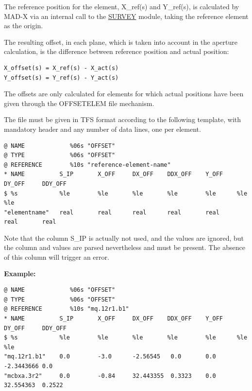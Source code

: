 The reference position for the element, X\_ref(s) and Y\_ref(s), is calculated 
by MAD-X via an internal call to the \href{../survey/survey.html}{SURVEY}
module, taking the reference element as the origin. 

The resulting offset, in each plane, which is taken into account in the aperture calculation, 
is the difference between reference position and actual position: 
\begin{verbatim}
X_offset(s) = X_ref(s) - X_act(s) 
Y_offset(s) = Y_ref(s) - Y_act(s)
\end{verbatim} 

The offsets are only calculated for elements for which actual positions 
have been given through the OFFSETELEM file mechanism. 

The file must be given in TFS format according to the following template, 
with mandatory header and any number of data lines, one per element. 

\begin{verbatim}
@ NAME             %06s "OFFSET" 
@ TYPE             %06s "OFFSET" 
@ REFERENCE        %10s "reference-element-name" 
* NAME          S_IP       X_OFF     DX_OFF    DDX_OFF    Y_OFF    DY_OFF     DDY_OFF
$ %s            %le        %le       %le       %le        %le      %le        %le
"elementname"	real       real      real      real       real     real       real
\end{verbatim}

Note that the column S\_IP is actually not used, and the values are ignored, 
but the column and values are parsed nevertheless and must be present. 
The absence of this column will trigger an error. 

{\bf Example:}
\begin{verbatim}
@ NAME             %06s "OFFSET" 
@ TYPE             %06s "OFFSET" 
@ REFERENCE        %10s "mq.12r1.b1" 
* NAME          S_IP       X_OFF     DX_OFF    DDX_OFF    Y_OFF    DY_OFF     DDY_OFF
$ %s            %le        %le       %le       %le        %le      %le        %le
"mq.12r1.b1"	0.0        -3.0      -2.56545   0.0       0.0      -2.3443666 0.0
"mcbxa.3r2"     0.0        -0.84     32.443355  0.3323    0.0      32.554363  0.2522
\end{verbatim}


